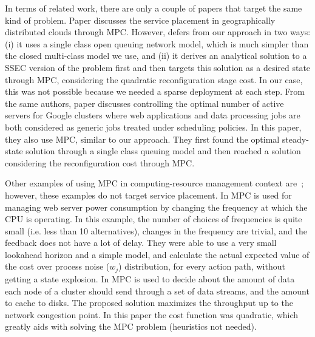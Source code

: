 In terms of related work, there are only a couple of papers that target the same kind of problem.
Paper \cite{zhang2012dynamicPlacement} discusses the service placement in geographically distributed clouds through MPC. However, \cite{zhang2012dynamicPlacement} defers from our approach in two ways: (i) it uses a single class open queuing network model, which is much simpler than the closed multi-class model we use, and (ii) it derives an analytical solution to a SSEC version of the problem first and then targets this solution as a desired state through MPC, considering the
quadratic reconfiguration stage cost. In our case, this was not possible because we needed a sparse deployment at each step. From the same authors, paper \cite{zhang2012dynamicProvisioning} discusses controlling the optimal number of active servers for Google clusters where web applications and data processing jobs are both considered as generic jobs treated under scheduling policies. In this paper, they also use MPC, similar to our approach. They first found the optimal steady-state solution through a single class queuing model and then reached a solution considering the reconfiguration cost through MPC.

Other examples of using MPC in computing-resource management context are~\cite{baiefficient,abdelwahed2004control, kandasamy2004self, bhat2006enabling,patikirikorala2011hammerstein}; however, these examples do not target service placement.
In \cite{baiefficient,abdelwahed2004control,kandasamy2004self} MPC is used for managing web server power consumption by changing the frequency at which the CPU is operating. 
In this example, the number of choices of frequencies is quite small (i.e. less than 10 alternatives), changes in the frequency are trivial, and the feedback does not have a lot of delay. 
They were able to use a very small lookahead horizon and a simple model, and calculate the actual expected value of the cost over process noise ($w_j$) distribution, for every action path, without getting a state explosion.  
In \cite{bhat2006enabling} MPC is used to decide about the amount of data each node of a cluster should send through a set of data streams, and the amount to cache to disks. The proposed solution maximizes the throughput up to the network congestion point. In this paper the cost function was quadratic, which greatly aids with solving the MPC problem (heuristics not needed).   

